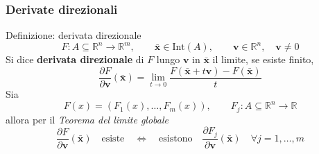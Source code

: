 \documentclass[x11names]{article}
\begin{document}
		\subsubsection{Derivate direzionali}
		\begin{center}
		\colorbox{myblue}{\begin{minipage}{5.75in}
			\begin{blues}{Definizione: derivata direzionale}
				\[
				F:A \subseteq \mathbb{R}^n \to \mathbb{R}^m, \qquad \mathbf{\bar{x}} \in \text{Int}(A), \qquad 					      \mathbf{v} \in \mathbb{R}^n, \quad \mathbf{v} \neq 0
				\]
				Si dice \textbf{derivata direzionale} di $F$ lungo $\mathbf{v}$ in  $\mathbf{\bar{x}}$ il limite, se esiste finito,
				\begin{equation}
					\frac{\partial F}{\partial \mathbf{v}}(\mathbf{\bar{x}}) = \lim_{t\to0} \frac{F( \mathbf{\bar{x}} + t \mathbf{v}) - F( \mathbf{\bar{x}} )}{t}
				\end{equation}
				Sia
				\[ 
				F(x) = \left(F_{1}(x),\dots,F_{m}(x)\right),\qquad F_{j}:A\subseteq \mathbb{R}^n\to\mathbb{R}
				\]
				allora per il \textit{Teorema del limite globale}
				\[ 
				\frac{\partial F}{\partial \mathbf{v}}(\mathbf{\bar{x}}) \quad \text{esiste} \quad \Longleftrightarrow \quad \text{esistono} \quad \frac{\partial F_{j}}{\partial 		\mathbf{v}}(\mathbf{\bar{x}}) \quad \forall j = 1,\dots,m
				\]
			\end{blues}
			\end{minipage}}       
		\end{center}
\end{document}
